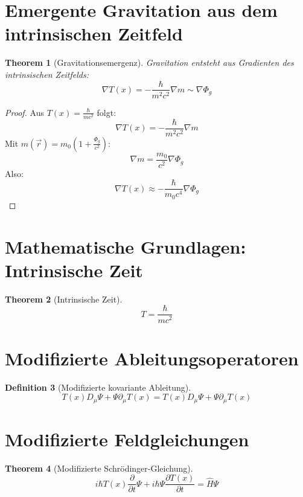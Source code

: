 \documentclass{article}
\newcommand{\Tfield}{T(x)}
\newcommand{\DcovT}[1]{\Tfield D_\mu #1 + #1 \partial_\mu \Tfield}
\newtheorem{theorem}{Theorem}[section]
\theoremstyle{definition}
\newtheorem{definition}[theorem]{Definition}
\theoremstyle{remark}
\begin{document}
	\section{Emergente Gravitation aus dem intrinsischen Zeitfeld}
	\begin{theorem}[Gravitationsemergenz]
		Gravitation entsteht aus Gradienten des intrinsischen Zeitfelds:
		\begin{equation}
			\nabla \Tfield = -\frac{\hbar}{m^2c^2} \nabla m \sim \nabla \Phi_g
		\end{equation}
	\end{theorem}
	
	\begin{proof}
		Aus \( \Tfield = \frac{\hbar}{mc^2} \) folgt:
		\begin{equation}
			\nabla \Tfield = -\frac{\hbar}{m^2c^2} \nabla m
		\end{equation}
		Mit \( m(\vec{r}) = m_0 (1 + \frac{\Phi_g}{c^2}) \):
		\begin{equation}
			\nabla m = \frac{m_0}{c^2} \nabla \Phi_g
		\end{equation}
		Also:
		\begin{equation}
			\nabla \Tfield \approx -\frac{\hbar}{m_0 c^4} \nabla \Phi_g
		\end{equation}
	\end{proof}
	
	\section{Mathematische Grundlagen: Intrinsische Zeit}
	\begin{theorem}[Intrinsische Zeit]
		\begin{equation}
			T = \frac{\hbar}{mc^2}
		\end{equation}
	\end{theorem}
	
	\section{Modifizierte Ableitungsoperatoren}
	\begin{definition}[Modifizierte kovariante Ableitung]
		\begin{equation}
			\DcovT{\Psi} = \Tfield D_\mu \Psi + \Psi \partial_\mu \Tfield
		\end{equation}
	\end{definition}
	
	\section{Modifizierte Feldgleichungen}
	\begin{theorem}[Modifizierte Schrödinger-Gleichung]
		\begin{equation}
			i\hbar \Tfield \frac{\partial}{\partial t} \Psi + i\hbar \Psi \frac{\partial \Tfield}{\partial t} = \hat{H} \Psi
		\end{equation}
	\end{theorem}
	
\end{document}
